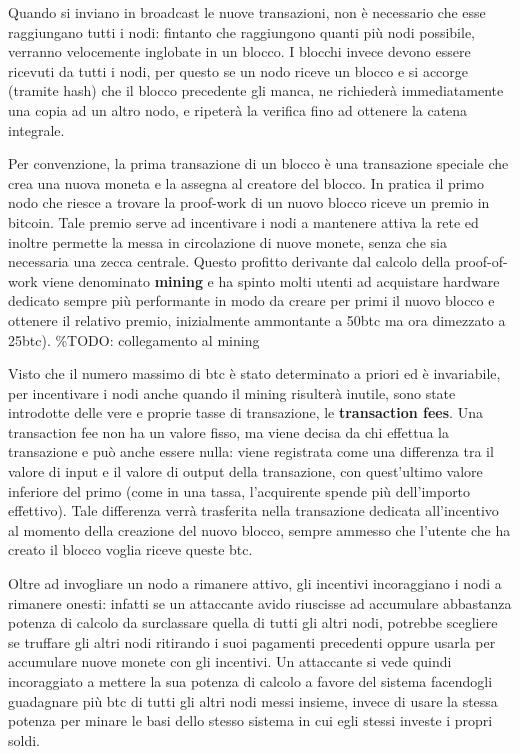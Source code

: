 Quando si inviano in broadcast le nuove transazioni, non è necessario
che esse raggiungano tutti i nodi: fintanto che raggiungono quanti più
nodi possibile, verranno velocemente inglobate in un blocco. I blocchi
invece devono essere ricevuti da tutti i nodi, per questo se un nodo
riceve un blocco e si accorge (tramite hash) che il blocco precedente
gli manca, ne richiederà immediatamente una copia ad un altro nodo, e
ripeterà la verifica fino ad ottenere la catena integrale.

Per convenzione, la prima transazione di un blocco è una transazione
speciale che crea una nuova moneta e la assegna al creatore del blocco.
In pratica il primo nodo che riesce a trovare la proof-work di un nuovo
blocco riceve un premio in bitcoin. Tale premio serve ad incentivare i
nodi a mantenere attiva la rete ed inoltre permette la messa in
circolazione di nuove monete, senza che sia necessaria una zecca
centrale. Questo profitto derivante dal calcolo della proof-of-work
viene denominato \textbf{mining} e ha spinto molti utenti ad acquistare
hardware dedicato sempre più performante in modo da creare per primi il
nuovo blocco e ottenere il relativo premio, inizialmente ammontante a
50btc ma ora dimezzato a 25btc). \%TODO: collegamento al mining

Visto che il numero massimo di btc è stato determinato a priori ed è
invariabile, per incentivare i nodi anche quando il mining risulterà
inutile, sono state introdotte delle vere e proprie tasse di
transazione, le \textbf{transaction fees}. Una transaction fee non ha un
valore fisso, ma viene decisa da chi effettua la transazione e può anche
essere nulla: viene registrata come una differenza tra il valore di
input e il valore di output della transazione, con quest'ultimo valore
inferiore del primo (come in una tassa, l'acquirente spende più
dell'importo effettivo). Tale differenza verrà trasferita nella
transazione dedicata all'incentivo al momento della creazione del nuovo
blocco, sempre ammesso che l'utente che ha creato il blocco voglia
riceve queste btc.

Oltre ad invogliare un nodo a rimanere attivo, gli incentivi
incoraggiano i nodi a rimanere onesti: infatti se un attaccante avido
riuscisse ad accumulare abbastanza potenza di calcolo da surclassare
quella di tutti gli altri nodi, potrebbe scegliere se truffare gli altri
nodi ritirando i suoi pagamenti precedenti oppure usarla per accumulare
nuove monete con gli incentivi. Un attaccante si vede quindi
incoraggiato a mettere la sua potenza di calcolo a favore del sistema
facendogli guadagnare più btc di tutti gli altri nodi messi insieme,
invece di usare la stessa potenza per minare le basi dello stesso
sistema in cui egli stessi investe i propri soldi.

